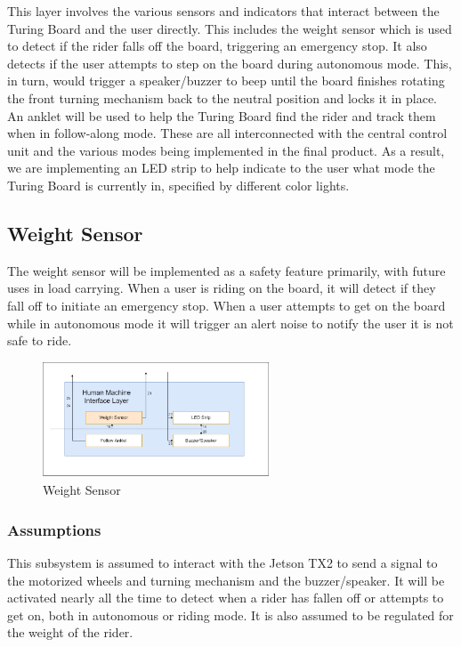 This layer involves the various sensors and indicators that interact between the Turing Board and the user directly. This includes the weight sensor which is used to detect if the rider falls off the board, triggering an emergency stop. It also detects if the user attempts to step on the board during autonomous mode. This, in turn, would trigger a speaker/buzzer to beep until the board finishes rotating the front turning mechanism back to the neutral position and locks it in place. An anklet will be used to help the Turing Board find the rider and track them when in follow-along mode. These are all interconnected with the central control unit and the various modes being implemented in the final product. As a result, we are implementing an LED strip to help indicate to the user what mode the Turing Board is currently in, specified by different color lights.

\subsection{Weight Sensor}
The weight sensor will be implemented as a safety feature primarily, with future uses in load carrying. When a user is riding on the board, it will detect if they fall off to initiate an emergency stop. When a user attempts to get on the board while in autonomous mode it will trigger an alert noise to notify the user it is not safe to ride.

\begin{figure}[h!]
	\centering
 	\includegraphics[width=0.60\textwidth]{ADS Latex/images/Kendall/Weight Sensor.png}
 \caption{Weight Sensor}
\end{figure}

\subsubsection{Assumptions}
This subsystem is assumed to interact with the Jetson TX2 to send a signal to the motorized wheels and turning mechanism and the buzzer/speaker. It will be activated nearly all the time to detect when a rider has fallen off or attempts to get on, both in autonomous or riding mode. It is also assumed to be regulated for the weight of the rider.

